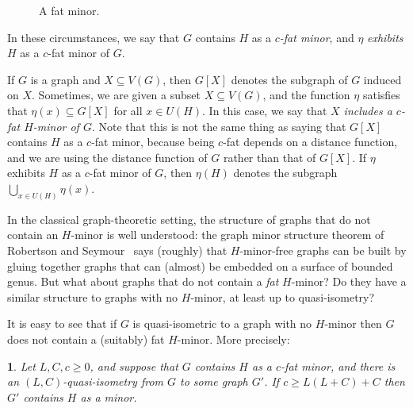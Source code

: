 \documentclass[titlepage,11pt]{article}
\newtheorem{thm}{}[section]
\begin{document}
\begin{figure}[H]
\begin{center}
		\end{center}
		\caption{A fat minor.} \label{fig:fatminor}
	\end{figure}
	In these circumstances, we say that $G$ contains $H$ as a {\em $c$-fat minor}, and $\eta$ {\em exhibits} $H$ as a $c$-fat minor 
	of $G$. 
	
	If $G$ is a graph and $X\subseteq V(G)$, then $G[X]$ denotes the subgraph of $G$ induced on $X$.
	Sometimes, we are given a subset $X\subseteq V(G)$, and the function $\eta$ satisfies that $\eta(x)\subseteq G[X]$ for all $x\in U(H)$.
	In this case, we say that {\em $X$ includes a $c$-fat $H$-minor of $G$}. Note that this is not the same thing as saying that $G[X]$
	contains $H$ as a $c$-fat minor, because being $c$-fat depends on a distance function, and we are using the distance function of $G$ rather than that
	of $G[X]$.  If $\eta$ exhibits $H$ as a $c$-fat minor of $G$, then
	$\eta(H)$ denotes the subgraph $\bigcup_{x\in U(H)}\eta(x)$.
	
	In the classical graph-theoretic setting, the structure of graphs that do not contain an $H$-minor is well understood: the graph minor structure theorem of Robertson and Seymour~\cite{GM16} says (roughly) that $H$-minor-free graphs can be built by gluing together graphs that can (almost) be embedded on a surface of bounded genus.  But what about graphs that do not contain a {\em fat} $H$-minor?   Do they have a similar structure to graphs with no $H$-minor, at least up to quasi-isometry?
	
	It is easy to see that if $G$ is quasi-isometric to a graph with no $H$-minor then $G$ does not contain a (suitably) fat $H$-minor.  More precisely:
	\begin{thm}\label{easyfat}
		Let $L,C,c\ge 0$, and suppose that $G$ contains $H$ as a $c$-fat minor, and there is an $(L,C)$-quasi-isometry from $G$ to some graph $G'$. 
		If $c\ge L(L+C)+C$ then 
		$G'$ contains $H$ as a minor.
	\end{thm}
	
\end{document}
